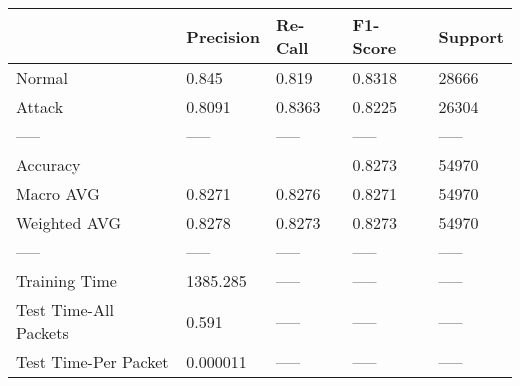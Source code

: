 \begin{tabular}{lllll}
\toprule
{} & Precision & Re-Call & F1-Score & Support \\
\midrule
Normal                &     0.845 &   0.819 &   0.8318 &   28666 \\
Attack                &    0.8091 &  0.8363 &   0.8225 &   26304 \\
-----                 &     ----- &   ----- &    ----- &   ----- \\
Accuracy              &           &         &   0.8273 &   54970 \\
Macro AVG             &    0.8271 &  0.8276 &   0.8271 &   54970 \\
Weighted AVG          &    0.8278 &  0.8273 &   0.8273 &   54970 \\
-----                 &     ----- &   ----- &    ----- &   ----- \\
Training Time         &  1385.285 &   ----- &    ----- &   ----- \\
Test Time-All Packets &     0.591 &   ----- &    ----- &   ----- \\
Test Time-Per Packet  &  0.000011 &   ----- &    ----- &   ----- \\
\bottomrule
\end{tabular}
